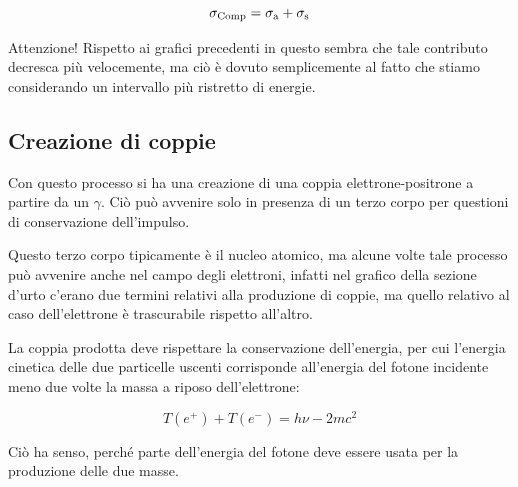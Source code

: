 \begin{equation*}
    \sigma_{\rm Comp}=\sigma_{\rm a} + \sigma_{\rm s}
\end{equation*}

Attenzione! Rispetto ai grafici precedenti in questo sembra che tale contributo decresca più velocemente, ma ciò è dovuto semplicemente al fatto che stiamo considerando un intervallo più ristretto di energie.

\subsection{Creazione di coppie}

Con questo processo si ha una creazione di una coppia elettrone-positrone a partire da un $\gamma$. Ciò può avvenire solo in presenza di un terzo corpo per questioni di conservazione dell'impulso.

\begin{figure}[H]
    \centering
\end{figure}

Questo terzo corpo tipicamente è il nucleo atomico, ma alcune volte tale processo può avvenire anche nel campo degli elettroni, infatti nel grafico della sezione d'urto c'erano due termini relativi alla produzione di coppie, ma quello relativo al caso dell'elettrone è trascurabile rispetto all'altro.

La coppia prodotta deve rispettare la conservazione dell'energia, per cui l'energia cinetica delle due particelle uscenti corrisponde all'energia del fotone incidente meno due volte la massa a riposo dell'elettrone:

\begin{equation*}
    T(e^+) + T(e^-)=h\nu - 2mc^2
\end{equation*}

Ciò ha senso, perché parte dell'energia del fotone deve essere usata per la produzione delle due masse.

